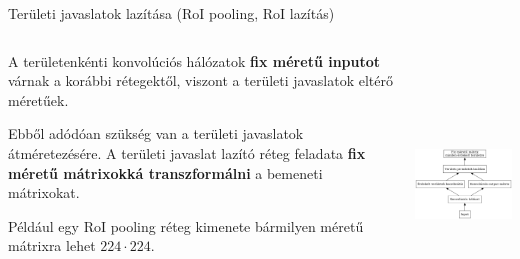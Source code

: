 \documentclass[english, aspectratio=169]{beamer}
\begin{document}
\begin{frame}{Területi javaslatok lazítása (RoI pooling, RoI lazítás)}
\begin{columns}
\begin{column}{.5\textwidth}
A területenkénti konvolúciós hálózatok \textbf{fix méretű inputot} várnak a korábbi rétegektől, viszont a területi javaslatok eltérő méretűek.\par\smallskip
Ebből adódóan szükség van a területi javaslatok átméretezésére. A területi javaslat lazító réteg feladata \textbf{fix méretű mátrixokká transzformálni} a bemeneti mátrixokat.\par\smallskip
Például egy RoI pooling réteg kimenete bármilyen méretű mátrixra lehet $224 \cdot 224$.
\end{column}
\begin{column}{.5\textwidth}
\begin{center}
\includegraphics[height=7cm, width=7cm, keepaspectratio]{graphs/od_6.png}
\end{center}
\end{column}
\end{columns}
\end{frame}
\end{document}
